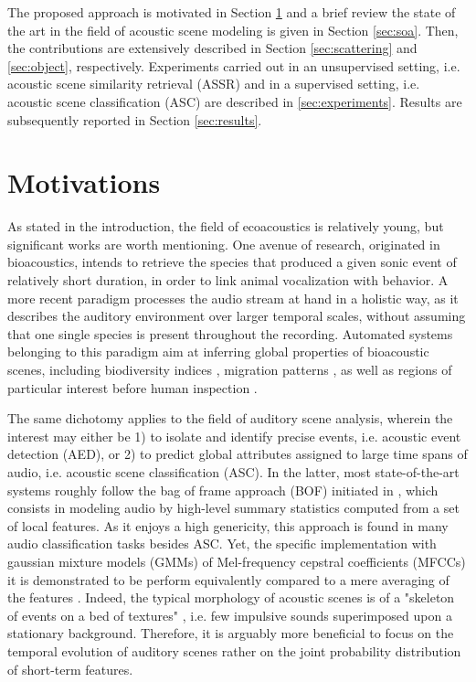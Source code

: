 \documentclass[journal]{IEEEtran}
\makeatletter
\newcommand*{\ie}{i.e.\@\xspace}
\makeatother
\begin{document}
The proposed approach is motivated in Section \ref{sec:motivations} and a brief review the state of the art in the field of acoustic scene modeling is given in Section \ref{sec:soa}. Then, the contributions are extensively described in Section \ref{sec:scattering} and \ref{sec:object}, respectively. Experiments carried out in an unsupervised setting, \ie acoustic scene similarity retrieval (ASSR) and in a supervised setting, \ie acoustic scene classification (ASC) are described in \ref{sec:experiments}. Results are subsequently reported in Section \ref{sec:results}.

\section{Motivations} \label{sec:motivations}

As stated in the introduction, the field of ecoacoustics is relatively young, but significant works are worth mentioning.
One avenue of research, originated in bioacoustics, intends to retrieve the species that produced a given sonic event of relatively short duration, in order to link animal vocalization with behavior\cite{au2008principles, stowell2014large}.
A more recent paradigm processes the audio stream at hand in a holistic way, as it describes the auditory environment over larger temporal scales, without assuming that one single species is present throughout the recording. Automated systems belonging to this paradigm aim at inferring global properties of bioacoustic scenes, including biodiversity indices \cite{Bardeli2010}, migration patterns \cite{Obrist2010}, as well as regions of particular interest before human inspection \cite{rosenstock2002landbird,diefenbach2007incorporating}.

The same dichotomy applies to the field of auditory scene analysis, wherein the interest may either be 1) to isolate and identify precise events, \ie acoustic event detection (AED), or 2) to predict global attributes assigned to large time spans of audio, \ie acoustic scene classification (ASC).
In the latter, most state-of-the-art systems roughly follow the bag of frame approach (BOF) initiated in \cite{aucouturier2007bag}, which consists in modeling audio by high-level summary statistics computed from a set of local features.
As it enjoys a high genericity, this approach is found in many audio classification tasks besides ASC.
Yet, the specific implementation with gaussian mixture models (GMMs) of Mel-frequency cepstral coefficients (MFCCs) it is demonstrated to be perform equivalently compared to a mere averaging of the features  \cite{lagrange:hal-01082501}.
Indeed, the typical morphology of acoustic scenes is of a "skeleton of events on a bed of textures" \cite{nelken_ear_2013}, \ie few impulsive sounds superimposed upon a stationary background.
Therefore, it is arguably more beneficial to focus on the temporal evolution of auditory scenes rather on the joint probability distribution of short-term features.
\end{document}
